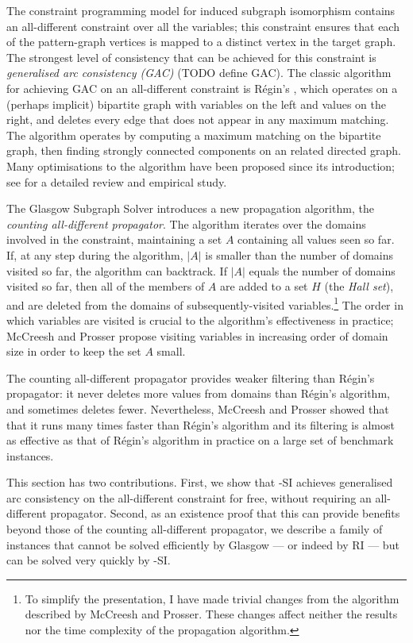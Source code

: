The constraint programming model for induced subgraph isomorphism contains an all-different
constraint over all the variables; this constraint ensures that each of the pattern-graph vertices
is mapped to a distinct vertex in the target graph.  The strongest level of consistency that can
be achieved for this constraint is \emph{generalised arc consistency (GAC)} (TODO define GAC).
The classic algorithm for achieving GAC on an all-different constraint is R\'egin's
\cite{DBLP:conf/aaai/Regin94}, which operates
on a (perhaps implicit) bipartite graph with variables on the left and values on the right, and 
deletes every edge that does not appear in any maximum matching.  The algorithm operates by computing
a maximum matching on the bipartite graph, then finding strongly connected components on an related directed
graph.  Many optimisations to the algorithm have been proposed since its introduction; see
\cite{DBLP:journals/ai/GentMN08} for a detailed review and empirical study.

The Glasgow Subgraph Solver \cite{DBLP:conf/cp/McCreeshP15} introduces a new propagation algorithm,
the \emph{counting all-different propagator}.
The algorithm iterates over the domains involved in the constraint, maintaining a set $A$ containing
all values seen so far.  If, at any step during the algorithm, $|A|$ is smaller than the number
of domains visited so far, the algorithm can backtrack.  If $|A|$ equals the number of domains visited
so far, then all of the members of $A$ are added to a set $H$ (the \emph{Hall set}), and are deleted from
the domains of subsequently-visited variables.\footnote{To simplify the presentation,
I have made trivial changes from the algorithm described by McCreesh and Prosser.
These changes affect neither the results nor the time complexity of the propagation algorithm.}
The order in which variables are visited is crucial
to the algorithm's effectiveness in practice; McCreesh and Prosser
propose visiting variables in increasing order of domain size in order to keep the set $A$ small.

The counting all-different propagator provides weaker filtering than
R\'egin's propagator: it never deletes more values from domains than R\'egin's algorithm, and sometimes
deletes fewer. Nevertheless, McCreesh and Prosser showed that that it runs many times faster than
R\'egin's algorithm and its filtering is almost as effective as that of R\'egin's algorithm in practice
on a large set of benchmark instances.

This section has two contributions. First, we show that \McSplit-SI achieves generalised arc consistency
on the all-different constraint for free, without requiring an all-different propagator.
Second, as an existence proof that this can provide benefits beyond those of the counting all-different
propagator, we describe
a family of instances that cannot be solved efficiently by Glasgow --- or indeed by RI --- but can
be solved very quickly by \McSplit-SI.

